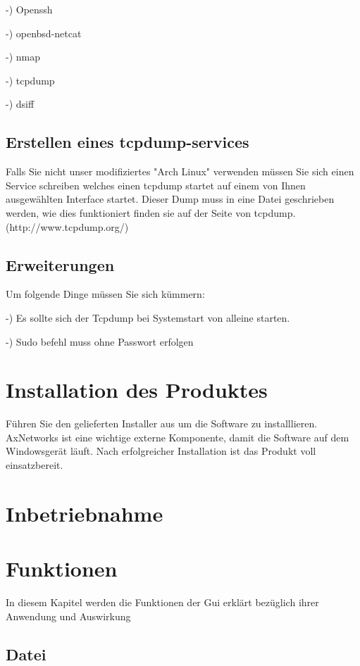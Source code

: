 \documentclass[11pt]{article} %
\begin{document}
-) Openssh

-) openbsd-netcat

-) nmap

-) tcpdump

-) dsiff

\subsection{Erstellen eines tcpdump-services}
Falls Sie nicht unser modifiziertes "Arch Linux" verwenden müssen Sie sich einen Service schreiben welches einen tcpdump startet auf einem von Ihnen ausgewählten Interface startet. Dieser Dump muss in eine Datei geschrieben werden, wie dies funktioniert finden sie auf der Seite von tcpdump.(http://www.tcpdump.org/)\\

\subsection{Erweiterungen}

Um folgende Dinge müssen Sie sich kümmern:

-) Es sollte sich der Tcpdump bei Systemstart von alleine starten.

-) Sudo befehl muss ohne Passwort erfolgen

\section{Installation des Produktes}

Führen Sie den gelieferten Installer aus um die Software zu installlieren.\\
AxNetworks ist eine wichtige externe Komponente, damit die Software auf dem Windowsgerät läuft.
Nach erfolgreicher Installation ist das Produkt voll einsatzbereit.\\

\section{Inbetriebnahme}

\pagebreak
\section{Funktionen}
In diesem Kapitel werden die Funktionen der Gui erklärt bezüglich ihrer Anwendung und Auswirkung \\
\subsection{Datei}
\end{document}
